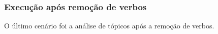 

\subsubsection{Execução após remoção de verbos}

O último cenário foi a análise de tópicos após a remoção de verbos.


